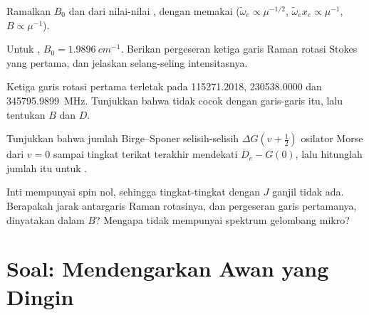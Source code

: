 \begin{exercise}[$\star\star$]\label{exo:b3:rovibrational-spectroscopy:8}
Ramalkan $B_0$ dan   dari nilai-nilai ,
dengan memakai  ($\tilde\omega_e \propto \mu^{-1/2}$,
$\tilde\omega_ex_e \propto
\mu^{-1}$, $B \propto \mu^{-1}$).
\end{exercise}

\begin{exercise}[$\star\star$]\label{exo:b3:rovibrational-spectroscopy:9}
Untuk , $B_0 = \qty{1.9896}{cm^{-1}}$. Berikan pergeseran ketiga garis
Raman rotasi Stokes yang pertama, dan jelaskan selang-seling intensitasnya.
\end{exercise}

\begin{exercise}[$\star\star\star$]\label{exo:b3:rovibrational-spectroscopy:10}
Ketiga garis rotasi pertama  terletak pada 115271.2018,
230538.0000 dan \qty{345795.9899}{MHz}. Tunjukkan bahwa  tidak
cocok dengan garis-garis itu, lalu tentukan $B$ dan  $D$.
\end{exercise}

\begin{exercise}[$\star\star\star$]\label{exo:b3:rovibrational-spectroscopy:11}
Tunjukkan bahwa jumlah Birge--Sponer selisih-selisih $\Delta G(v + \frac12)$
osilator Morse dari $v = 0$ sampai tingkat terikat terakhir mendekati
$D_e - G(0)$, lalu hitunglah jumlah itu untuk .
\end{exercise}

\begin{exercise}[$\star\star\star$]\label{exo:b3:rovibrational-spectroscopy:12}
Inti  mempunyai spin nol, sehingga tingkat-tingkat
 dengan $J$ ganjil tidak ada. Berapakah jarak antargaris
Raman rotasinya, dan pergeseran garis pertamanya, dinyatakan dalam $B$?
Mengapa  tidak mempunyai spektrum gelombang mikro?
\end{exercise}

\section{Soal: Mendengarkan Awan yang Dingin}

